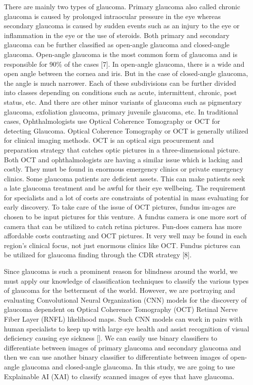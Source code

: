 \vspace{5mm}
There are mainly two types of glaucoma. Primary glaucoma also called chronic glaucoma is caused by prolonged intraocular pressure in the eye whereas secondary glaucoma is caused by sudden events such as an injury to the eye or inflammation in the eye or the use of steroids. Both primary and secondary glaucoma can be further classified as open-angle glaucoma and closed-angle glaucoma. Open-angle glaucoma is the most common form of glaucoma and is responsible for 90\% of the cases [7].  In open-angle glaucoma, there is a wide and open angle between the cornea and iris. But in the case of closed-angle glaucoma, the angle is much narrower. Each of these subdivisions can be further divided into classes depending on conditions such as acute, intermittent, chronic, post status, etc. And there are other minor variants of glaucoma such as pigmentary glaucoma, exfoliation glaucoma, primary juvenile glaucoma, etc. In traditional cases, Ophthalmologists use Optical Coherence Tomography or OCT for detecting Glaucoma. Optical Coherence Tomography or OCT is generally utilized for clinical imaging methods. OCT is an optical sign procurement and preparation strategy that catches optic pictures in a three-dimensional picture. Both OCT and ophthalmologists are having a similar issue which is lacking and costly. They must be found in enormous emergency clinics or private emergency clinics. Some glaucoma patients are deficient assets. This can make patients seek a late glaucoma treatment and be awful for their eye wellbeing. The requirement for specialists and a lot of costs are constraints of potential in mass evaluating for early discovery. To take care of the issue of OCT pictures, fundus im-ages are chosen to be input pictures for this venture. A fundus camera is one more sort of camera that can be utilized to catch retina pictures. Fun-does camera has more affordable costs contrasting and OCT pictures. It very well may be found in each region's clinical focus, not just enormous clinics like OCT. Fundus pictures can be utilized for glaucoma finding through the CDR strategy [8].

\vspace{5mm}
Since glaucoma is such a prominent reason for blindness around the world, we must apply our knowledge of classification techniques to classify the various types of glaucoma for the betterment of the world. However, we are portraying and evaluating Convolutional Neural Organization (CNN) models for the discovery of glaucoma dependent on Optical Coherence Tomography (OCT) Retinal Nerve Fiber Layer (RNFL) likelihood maps. Such CNN models can work in pairs with human specialists to keep up with large eye health and assist recognition of visual deficiency causing eye sickness []. We can easily use binary classifiers to differentiate between images of primary glaucoma and secondary glaucoma and then we can use another binary classifier to differentiate between images of open-angle glaucoma and closed-angle glaucoma. In this study, we are going to use Explainable AI (XAI) to classify scanned images of eyes that have glaucoma.

